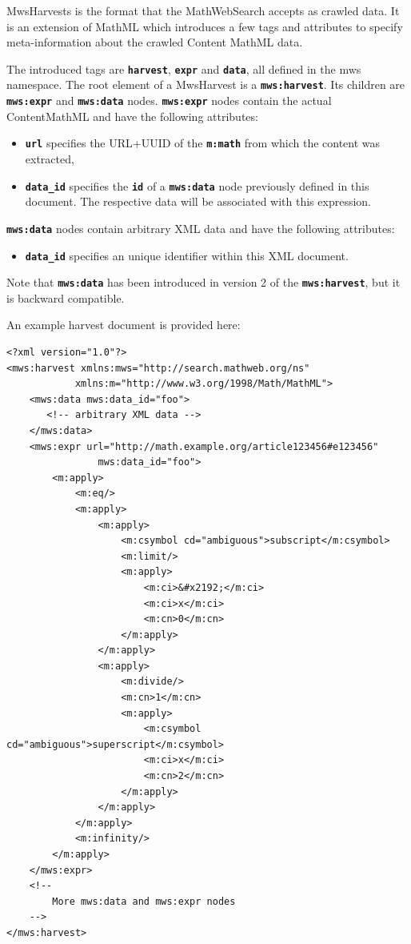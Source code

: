 \documentclass{deliverablereport}
\begin{document}
MwsHarvests is the format that the MathWebSearch accepts as crawled data. It is an
extension of MathML which introduces a few tags and attributes to specify meta-information
about the crawled Content MathML data. ~\cite{MWSH}

The introduced tags are \textbf{\texttt{harvest}}, \textbf{\texttt{expr}} and
\textbf{\texttt{data}}, all defined in the mws namespace. The root element of a MwsHarvest
is a \textbf{\texttt{mws:harvest}}. Its children are \textbf{\texttt{mws:expr}} and
\textbf{\texttt{mws:data}} nodes. \textbf{\texttt{mws:expr}} nodes contain the actual
ContentMathML and have the following attributes:

\begin{itemize}
\item \textbf{\texttt{url}} specifies the URL+UUID of the \textbf{\texttt{m:math}} from
  which the content was extracted,
\item \textbf{\texttt{data\_id}} specifies the \textbf{\texttt{id}} of a
  \textbf{\texttt{mws:data}} node previously defined in this document. The respective data
  will be associated with this expression.
\end{itemize}

\textbf{\texttt{mws:data}} nodes contain arbitrary XML data and have the following
attributes:
\begin{itemize}
\item \textbf{\texttt{data\_id}} specifies an unique identifier within this XML document.
\end{itemize}

Note that \textbf{\texttt{mws:data}} has been introduced in version 2 of the
\textbf{\texttt{mws:harvest}}, but it is backward compatible.

An example harvest document is provided here:

\lstset{language=XML}
\begin{lstlisting}
<?xml version="1.0"?>
<mws:harvest xmlns:mws="http://search.mathweb.org/ns" 
			xmlns:m="http://www.w3.org/1998/Math/MathML">
    <mws:data mws:data_id="foo">
       <!-- arbitrary XML data -->
    </mws:data>
    <mws:expr url="http://math.example.org/article123456#e123456"
    			mws:data_id="foo">
        <m:apply>
            <m:eq/>
            <m:apply>
                <m:apply>
                    <m:csymbol cd="ambiguous">subscript</m:csymbol>
                    <m:limit/>
                    <m:apply>
                        <m:ci>&#x2192;</m:ci>
                        <m:ci>x</m:ci>
                        <m:cn>0</m:cn>
                    </m:apply>
                </m:apply>
                <m:apply>
                    <m:divide/>
                    <m:cn>1</m:cn>
                    <m:apply>
                        <m:csymbol cd="ambiguous">superscript</m:csymbol>
                        <m:ci>x</m:ci>
                        <m:cn>2</m:cn>
                    </m:apply>
                </m:apply>
            </m:apply>
            <m:infinity/>
        </m:apply>
    </mws:expr>
    <!--
        More mws:data and mws:expr nodes
    -->
</mws:harvest>
\end{lstlisting}
\end{document}
